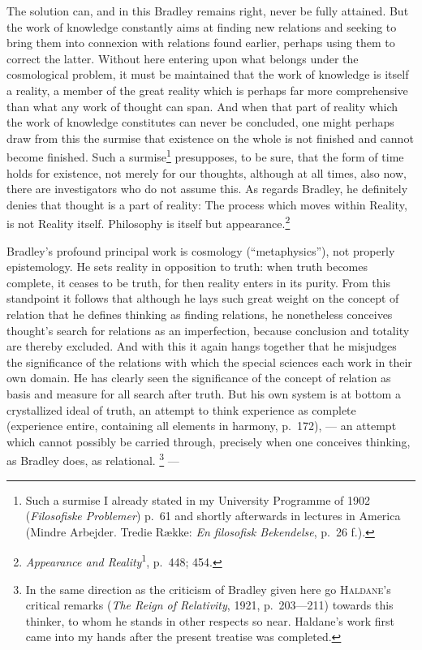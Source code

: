\documentclass[12pt]{article}
\newcommand{\opage}[1]{\marginnote{\footnotesize\textit{[#1]}}}
\begin{document}
The solution can, and in this Bradley remains right, never be fully
attained. But the work of knowledge constantly aims at finding new relations
and seeking to bring them into connexion with relations found earlier,
perhaps using them to \opage{49}correct the latter. Without here entering upon what
belongs under the cosmological problem, it must be maintained that the work
of knowledge is itself a reality, a member of the great reality which is
perhaps far more comprehensive than what any work of thought can span. And
when that part of reality which the work of knowledge constitutes can never
be concluded, one might perhaps draw from this the surmise that existence on
the whole is not finished and cannot become finished. Such a
surmise\footnote{Such a surmise I already stated in my University Programme
of 1902 (\textit{Filosofiske Problemer}) p.~61 and shortly afterwards in
lectures in America (Mindre Arbejder. Tredie Række: \textit{En filosofisk
Bekendelse}, p.~26 f.).} presupposes, to be sure, that the form of time
holds for existence, not merely for our thoughts, although at all times,
also now, there are investigators who do not assume this. As regards
Bradley, he definitely denies that thought is a part of reality: The process
which moves within Reality, is not Reality itself. Philosophy is itself but
appearance.\footnote{\textit{Appearance and Reality}\textsuperscript{1},
p.~448; 454.}

Bradley's profound principal work is cosmology (``metaphysics''), not
properly epistemology. He sets reality in opposition to truth: when truth
becomes complete, it ceases to be truth, for then reality enters in its
purity. From this standpoint it follows that although he lays such great
weight on the concept of relation that he defines thinking as finding
relations, he nonetheless conceives thought's search for relations as an
imperfection, because conclusion and totality are thereby excluded. And with
this it again hangs together that he misjudges the significance of the
relations with which the special sciences each work in their own domain. He
has clearly seen the significance of the concept of relation as basis and
\opage{50}measure for all search after truth. But his own system is at bottom a
crystallized ideal of truth, an attempt to think experience as complete
(experience entire, containing all elements in harmony, p.~172), --- an
attempt which cannot possibly be carried through, precisely when one
conceives thinking, as Bradley does, as relational.%
\footnote{In the same direction as the criticism of Bradley given here go
\textsc{Haldane}'s critical remarks (\textit{The Reign of Relativity}, 1921,
p.~203---211) towards this thinker, to whom he stands in other respects so
near. Haldane's work first came into my hands after the present treatise was
completed.} ---
\end{document}
